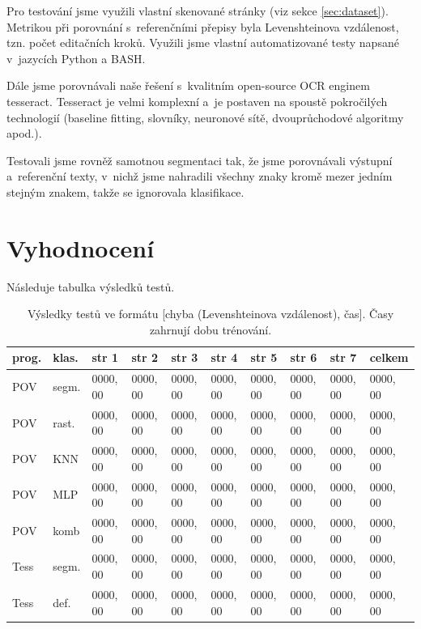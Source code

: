 \documentclass[12pt]{article}
\begin{document}
Pro testování jsme využili vlastní skenované stránky (viz sekce \ref{sec:dataset}). Metrikou
při porovnání s~referenčními přepisy byla Levenshteinova vzdálenost, tzn. počet editačních kroků. \cite{lev}
Využili jsme vlastní automatizované testy napsané v~jazycích Python a BASH.

Dále jsme porovnávali naše řešení s~kvalitním open-source OCR enginem tesseract. \cite{tess} Tesseract
je velmi komplexní a~je postaven na spoustě pokročilých technologií (baseline fitting, slovníky, neuronové sítě,
dvouprůchodové algoritmy apod.). \cite{tess2}

Testovali jsme rovněž samotnou segmentaci tak, že jsme porovnávali výstupní a~referenční texty, v~nichž jsme
nahradili všechny znaky kromě mezer jedním stejným znakem, takže se ignorovala klasifikace.


\section{Vyhodnocení}

Následuje tabulka výsledků testů.

\begin{table}[htb]
{\scriptsize
\begin{tabular}{|l|l|l|l|l|l|l|l|l|l|} 
 \hline
 prog. & klas. & str 1 & str 2 & str 3 & str 4 & str 5 & str 6 & str 7 & celkem \\
 \hline\hline
 POV   & segm. & 0000, 00 & 0000, 00 & 0000, 00 & 0000, 00 & 0000, 00 & 0000, 00 & 0000, 00 & 0000, 00 \\
 \hline
 POV   & rast. & 0000, 00 & 0000, 00 & 0000, 00 & 0000, 00 & 0000, 00 & 0000, 00 & 0000, 00 & 0000, 00 \\
 \hline
 POV   & KNN & 0000, 00 & 0000, 00 & 0000, 00 & 0000, 00 & 0000, 00 & 0000, 00 & 0000, 00 & 0000, 00 \\
 \hline
 POV   & MLP & 0000, 00 & 0000, 00 & 0000, 00 & 0000, 00 & 0000, 00 & 0000, 00 & 0000, 00 & 0000, 00 \\
 \hline
 POV   & komb & 0000, 00 & 0000, 00 & 0000, 00 & 0000, 00 & 0000, 00 & 0000, 00 & 0000, 00 & 0000, 00 \\
 \hline
 Tess  & segm. & 0000, 00 & 0000, 00 & 0000, 00 & 0000, 00 & 0000, 00 & 0000, 00 & 0000, 00 & 0000, 00 \\
 \hline
 Tess  & def. & 0000, 00 & 0000, 00 & 0000, 00 & 0000, 00 & 0000, 00 & 0000, 00 & 0000, 00 & 0000, 00 \\
 \hline
\end{tabular}
}
\caption{Výsledky testů ve formátu [chyba (Levenshteinova vzdálenost), čas]. Časy zahrnují dobu trénování.}
\end{table}
\end{document}
